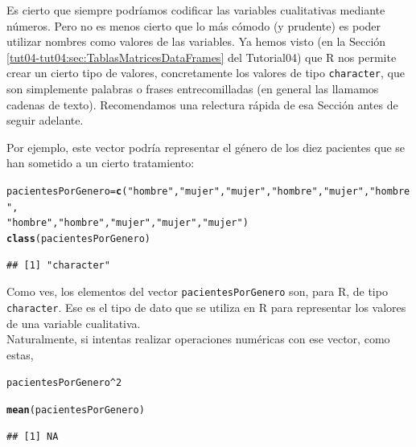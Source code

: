 \documentclass[10pt,a4paper]{article}\usepackage[]{graphicx}\usepackage[]{color}
\makeatletter
\newcommand{\hlnum}[1]{\textcolor[rgb]{0.686,0.059,0.569}{#1}}%
\newcommand{\hlstr}[1]{\textcolor[rgb]{0.192,0.494,0.8}{#1}}%
\newcommand{\hlopt}[1]{\textcolor[rgb]{0,0,0}{#1}}%
\newcommand{\hlstd}[1]{\textcolor[rgb]{0.345,0.345,0.345}{#1}}%
\newcommand{\hlkwb}[1]{\textcolor[rgb]{0.69,0.353,0.396}{#1}}%
\newcommand{\hlkwd}[1]{\textcolor[rgb]{0.737,0.353,0.396}{\textbf{#1}}}%
\newenvironment{kframe}{%
 \def\at@end@of@kframe{}%
 \ifinner\ifhmode%
  \def\at@end@of@kframe{\end{minipage}}%
  \begin{minipage}{\columnwidth}%
 \fi\fi%
 \def\FrameCommand##1{\hskip\@totalleftmargin \hskip-\fboxsep
 \colorbox{shadecolor}{##1}\hskip-\fboxsep
     \hskip-\linewidth \hskip-\@totalleftmargin \hskip\columnwidth}%
 \MakeFramed {\advance\hsize-\width
   \@totalleftmargin\z@ \linewidth\hsize
   \@setminipage}}%
 {\par\unskip\endMakeFramed%
 \at@end@of@kframe}
\newenvironment{knitrout}{}{} %
\makeatother
\begin{document}
Es cierto que siempre podríamos codificar las variables cualitativas mediante números.  Pero no es menos cierto que lo más cómodo (y prudente) es poder utilizar nombres como valores de las variables. Ya hemos visto (en la Sección \ref{tut04-tut04:sec:TablasMatricesDataFrames} del Tutorial04) que R nos permite crear un cierto tipo de valores, concretamente los valores de tipo {\tt character}, que  son simplemente palabras o frases entrecomilladas (en general las llamamos cadenas de texto).  Recomendamos una relectura rápida de esa Sección antes de seguir adelante.

Por ejemplo, este vector podría representar el género de los diez pacientes que se han sometido a un cierto tratamiento:
\begin{knitrout}
\color{fgcolor}\begin{kframe}
\begin{alltt}
\hlstd{pacientesPorGenero}\hlkwb{=}\hlkwd{c}\hlstd{(}\hlstr{"hombre"}\hlstd{,} \hlstr{"mujer"}\hlstd{,} \hlstr{"mujer"}\hlstd{,} \hlstr{"hombre"}\hlstd{,} \hlstr{"mujer"}\hlstd{,} \hlstr{"hombre"}\hlstd{,}
    \hlstr{"hombre"}\hlstd{,} \hlstr{"hombre"}\hlstd{,} \hlstr{"mujer"}\hlstd{,} \hlstr{"mujer"}\hlstd{,} \hlstr{"mujer"}\hlstd{)}
\hlkwd{class}\hlstd{(pacientesPorGenero)}
\end{alltt}
\begin{verbatim}
## [1] "character"
\end{verbatim}
\end{kframe}
\end{knitrout}
Como ves, los elementos del vector {\tt pacientesPorGenero} son, para R, de tipo {\tt character}. Ese es el tipo de dato que se utiliza en R para representar los valores de una variable cualitativa. \\

Naturalmente, si intentas  realizar operaciones numéricas con ese vector, como estas,

\begin{knitrout}
\color{fgcolor}\begin{kframe}
\begin{alltt}
\hlstd{pacientesPorGenero}\hlopt{^}\hlnum{2}
\end{alltt}


{\ttfamily\noindent\bfseries{}}\begin{alltt}
\hlkwd{mean}\hlstd{(pacientesPorGenero)}
\end{alltt}


{\ttfamily\noindent\color{warningcolor}{\#\# Warning in mean.default(pacientesPorGenero): argument is not numeric or logical: returning NA}}\begin{verbatim}
## [1] NA
\end{verbatim}
\end{kframe}
\end{knitrout}
\end{document}
